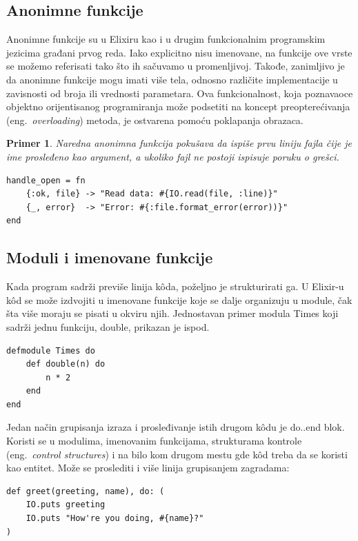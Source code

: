 \documentclass[a4paper]{article}
\newtheorem{primer}{Primer}[section]
\begin{document}
\subsection{Anonimne funkcije}
Anonimne funkcije su u Elixiru kao i u drugim funkcionalnim programskim jezicima građani prvog reda. Iako explicitno nisu imenovane, na funkcije ove vrste se možemo referisati tako što ih sačuvamo u promenljivoj. Takođe, zanimljivo je da anonimne funkcije mogu imati više tela, odnosno različite implementacije u zavisnosti od broja ili vrednosti parametara. Ova funkcionalnost, koja poznavaoce objektno orijentisanog programiranja može podsetiti na koncept preopterećivanja (eng.~{\em overloading}) metoda, je ostvarena pomoću poklapanja obrazaca.
\begin{primer}
Naredna anonimna funkcija pokušava da ispiše prvu liniju fajla čije je ime prosleđeno kao argument, a ukoliko fajl ne postoji ispisuje poruku o grešci.
\end{primer}
\begin{lstlisting}[caption={Primer anonimne funkcije}, label=simple]
handle_open = fn
    {:ok, file} -> "Read data: #{IO.read(file, :line)}"
    {_, error}  -> "Error: #{:file.format_error(error))}"
end
\end{lstlisting}
\label{sec:ime}

\subsection{Moduli i imenovane funkcije}
\label{sec:ime}
Kada program sadrži previše linija kôda, poželjno je strukturirati ga. U Elixir-u kôd se može izdvojiti u imenovane funkcije koje se dalje organizuju u module, čak šta više moraju se pisati u okviru njih. 
Jednostavan primer modula Times koji sadrži jednu funkciju, double, prikazan je ispod. 
\begin{lstlisting}[caption={Množenje broja sa 2}, label=simple]
defmodule Times do
    def double(n) do
        n * 2
    end
end   
\end{lstlisting}

Jedan način grupisanja izraza i prosleđivanje istih drugom kôdu je do..end blok. Koristi se u modulima, imenovanim funkcijama, strukturama kontrole (eng.~{\em control structures}) i na bilo kom drugom mestu gde kôd treba da se koristi kao entitet. Može se proslediti i više linija grupisanjem zagradama:
\begin{lstlisting}[caption={Ispisivanje poruke pozdrava}, label=simple]
def greet(greeting, name), do: (
    IO.puts greeting
    IO.puts "How're you doing, #{name}?"
)
\end{lstlisting}
\end{document}
